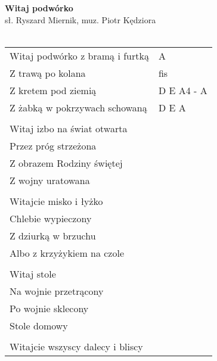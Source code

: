 \documentclass[a5paper]{article}
\begin{document}


\noindent
\fontsize{12pt}{15pt}\selectfont
\textbf{Witaj podwórko} \\
\fontsize{8pt}{10pt}\selectfont
sł. Ryszard Miernik, muz. Piotr Kędziora\\ \\
\fontsize{10pt}{12pt}\selectfont
{}
\begin{tabular}{@{}p{7.50cm}p{3cm}@{}}
\noindent
Witaj podwórko z bramą i furtką & A \\
Z trawą po kolana & fis \\
Z kretem pod ziemią & D E A4 - A \\
Z żabką w pokrzywach schowaną & D E A \\ \\

Witaj izbo na świat otwarta \\
Przez próg strzeżona \\
Z obrazem Rodziny świętej \\
Z wojny uratowana \\\\

Witajcie misko i łyżko\\
Chlebie wypieczony\\
Z dziurką w brzuchu\\
Albo z krzyżykiem na czole\\\\

Witaj stole\\
Na wojnie przetrącony\\
Po wojnie sklecony\\
Stole domowy\\\\

Witajcie wszyscy dalecy i bliscy
\end{tabular}
\end{document}
